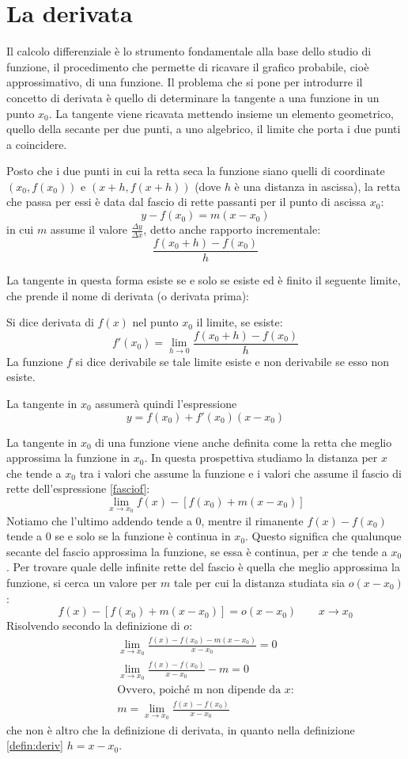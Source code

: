 \section{La derivata}
Il calcolo differenziale è lo strumento fondamentale alla base dello studio di funzione, il procedimento che permette di ricavare il grafico probabile, cioè approssimativo, di una funzione. Il problema che si pone per introdurre il concetto di derivata è quello di determinare la tangente a una funzione in un punto $x_0$. La tangente viene ricavata mettendo insieme un elemento geometrico, quello della secante per due punti, a uno algebrico, il limite che porta i due punti a coincidere.

Posto che i due punti in cui la retta seca la funzione siano quelli di coordinate $(x_0, f(x_0))$ e $(x+h, f(x+h))$ (dove $h$ è una distanza in ascissa), la retta che passa per essi è data dal fascio di rette passanti per il punto di ascissa $x_0$:
\begin{equation}
	\label{fasciof}
	y-f(x_0)=m(x-x_0)
\end{equation}
in cui $m$ assume il valore $\frac{\Delta y}{\Delta x}$, detto anche rapporto incrementale:
\[
	\frac{f(x_0+h)-f(x_0)}{h}
\]

La tangente in questa forma esiste se e solo se esiste ed è finito il seguente limite, che prende il nome di derivata (o derivata prima):
\begin{defin}[Derivata]
	Si dice derivata di $f(x)$ nel punto $x_0$ il limite, se esiste:
	\label{defin:deriv}
	\[
		f'(x_0)=\lim_{h\to0} \frac{f(x_0+h)-f(x_0)}{h}
	\]
	La funzione $f$ si dice derivabile se tale limite esiste e non derivabile se esso non esiste.
\end{defin}
La tangente in $x_0$ assumerà quindi l'espressione
\[
	y=f(x_0)+f'(x_0)(x-x_0)
\]

La tangente in $x_0$ di una funzione viene anche definita come la retta che meglio approssima la funzione in $x_0$. In questa prospettiva studiamo la distanza per $x$ che tende a $x_0$ tra i valori che assume la funzione e i valori che assume il fascio di rette dell'espressione \ref{fasciof}:
\[
	\lim_{x\to x_0} f(x)-[f(x_0)+m(x-x_0)]
\]
Notiamo che l'ultimo addendo tende a $0$, mentre il rimanente $f(x)-f(x_0)$ tende a $0$ se e solo se la funzione è continua in $x_0$. Questo significa che qualunque secante del fascio approssima la funzione, se essa è continua, per $x$ che tende a $x_0$. Per trovare quale delle infinite rette del fascio è quella che meglio approssima la funzione, si cerca un valore per $m$ tale per cui la distanza studiata sia $o(x-x_0)$:
\[
	f(x)-[f(x_0)+m(x-x_0)]=o(x-x_0)\qquad x\to x_0
\]
Risolvendo secondo la definizione di $o$:
\begin{gather*}
	\lim_{x\to x_0}\frac{f(x)-f(x_0)-m(x-x_0)}{x-x_0}=0\\
	\lim_{x\to x_0}\frac{f(x)-f(x_0)}{x-x_0}-m=0\\
	\text{Ovvero, poiché m non dipende da $x$:}\\
	m=\lim_{x\to x_0} \frac{f(x)-f(x_0)}{x-x_0}
\end{gather*}
che non è altro che la definizione di derivata, in quanto nella definizione \ref{defin:deriv} $h=x-x_0$.


